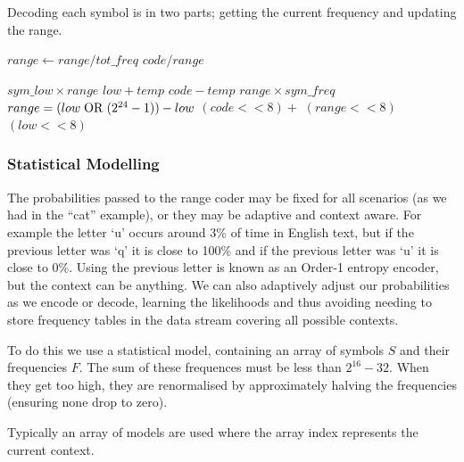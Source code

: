 \documentclass[a4paper]{article}
\begin{document}
Decoding each symbol is in two parts; getting the current frequency and updating the range.

\begin{algorithmic}[1]
  \State $range \gets range / tot\_freq$
  \State \Return $code / range$
\EndFunction
\end{algorithmic}

\begin{algorithmic}[1]
  \settowidth{\maxwidth}{range\ }
  \State {} $sym\_low \times range$
  \State {} $low + temp$
  \State {} $code - temp$
  \State {} $range \times sym\_freq$
   
      \State $range = (low \bitor (2^{24}-1)) - low$
    \EndIf
    \State {} $(code<<8) + $
    \State {} $(range<<8)$
    \State {} $(low<<8)$
  \EndWhile
\EndProcedure
\end{algorithmic}

\subsubsection*{Statistical Modelling}

The probabilities passed to the range coder may be fixed for all scenarios (as we had in the ``cat'' example), or they may be adaptive and context aware.
For example the letter `u' occurs around 3\% of time in English text, but if the previous letter was `q' it is close to 100\% and if the previous letter was `u' it is close to 0\%.
Using the previous letter is known as an Order-1 entropy encoder, but the context can be anything.
We can also adaptively adjust our probabilities as we encode or
decode, learning the likelihoods and thus avoiding needing to store
frequency tables in the data stream covering all possible contexts.

To do this we use a statistical model, containing an array of symbols $S$ and their frequencies $F$.
The sum of these frequences must be less than $2^{16}-32$.
When they get too high, they are renormalised by approximately halving the frequencies (ensuring none drop to zero).

Typically an array of models are used where the array index represents the current context.
\end{document}
